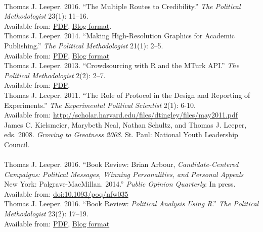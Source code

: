 \documentclass[12pt]{article}
\newcommand{\topic}[1]{\pagebreak[3]\indent {\color{lg}{\footnotesize #1 }}\\}
\newcommand{\entry}[1]{\indent {\color{lg}\guillemotright}\hspace{2pt}#1\vspace{.25em}\\}
\begin{document}
{\topic{Other Academic Publications}
    \entry{Thomas J. Leeper. 2016. ``The Multiple Routes to Credibility.'' \textit{The Political Methodologist} 23(1): 11--16.\\ Available from: \href{https://thepoliticalmethodologist.files.wordpress.com/2016/02/tpm_v23_n1.pdf}{PDF}, \href{https://thepoliticalmethodologist.com/2015/12/21/the-multiple-routes-to-credibility/}{Blog format}.}
	\entry{Thomas J. Leeper. 2014. ``Making High-Resolution Graphics for Academic Publishing.'' \textit{The Political Methodologist} 21(1): 2--5.\\ Available from: \href{https://thepoliticalmethodologist.files.wordpress.com/2014/06/tpm_v21_n12.pdf}{PDF}, \href{https://thepoliticalmethodologist.com/2013/11/25/making-high-resolution-graphics-for-academic-publishing/}{Blog format}}
	\entry{Thomas J. Leeper. 2013. ``Crowdsourcing with R and the MTurk API.'' \textit{The Political Methodologist} 2(2): 2--7.\\ Available from: \href{https://thepoliticalmethodologist.files.wordpress.com/2013/09/tpm_v20_n21.pdf}{PDF}.}
	\entry{Thomas J. Leeper. 2011. ``The Role of Protocol in the Design and Reporting of Experiments.'' \textit{The Experimental Political Scientist} 2(1): 6-10.\\ Available from: \url{http://scholar.harvard.edu/files/dtingley/files/may2011.pdf}}
	\entry{James C. Kielsmeier, Marybeth Neal, Nathan Schultz, and Thomas J. Leeper, eds. 2008. \textit{Growing to Greatness 2008}. St. Paul: National Youth Leadership Council.}

\topic{Book Reviews}
	\entry{Thomas J. Leeper. 2016. ``Book Review: Brian Arbour, \textit{Candidate-Centered Campaigns: Political Messages, Winning Personalities, and Personal Appeals} New York: Palgrave-MacMillan. 2014.'' \textit{Public Opinion Quarterly}: In press. Available from: \href{http://doi.org/10.1093/poq/nfw035}{doi:10.1093/poq/nfw035}}
	\entry{Thomas J. Leeper. 2016. ``Book Review: \textit{Political Analysis Using R}.'' \textit{The Political Methodologist} 23(2): 17--19.\\ Available from: \href{https://thepoliticalmethodologist.files.wordpress.com/2016/08/tpm_v23_n2.pdf}{PDF}, \href{https://thepoliticalmethodologist.com/2016/05/25/book-review-political-analysis-using-r/}{Blog format}}

}
\end{document}
